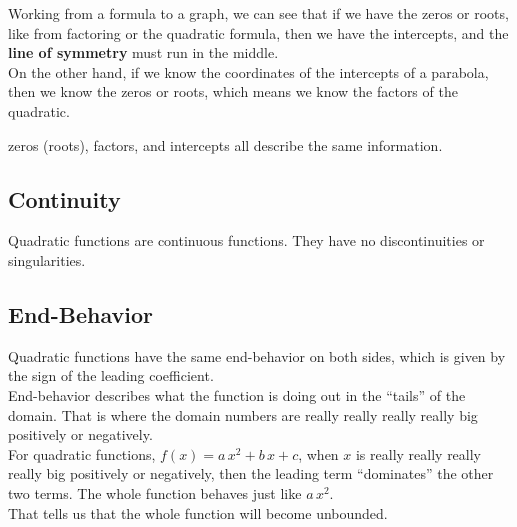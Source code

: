 \documentclass{ximera}
\begin{document}
Working from a formula to a graph, we can see that if we have the zeros or roots, like from factoring or the quadratic formula, then we have the intercepts, and the \textbf{line of symmetry} must run in the middle. \\


On the other hand, if we know the coordinates of the intercepts of a parabola, then we know the zeros or roots, which means we know the factors of the quadratic.




\begin{idea}

zeros (roots), factors, and intercepts all describe the same information.


\end{idea}






\subsection*{Continuity}

Quadratic functions are continuous functions.  They have no discontinuities or singularities. \\












\subsection*{End-Behavior}

Quadratic functions have the same end-behavior on both sides, which is given by the sign of the leading coefficient. \\


End-behavior describes what the function is doing out in the ``tails'' of the domain.  That is where the domain numbers are really really really really big positively or negatively. \\

For quadratic functions, $f(x) = a \, x^2 + b \, x + c$, when $x$ is really really really really big positively or negatively, then the leading term ``dominates'' the other two terms.  The whole function behaves just like $a \, x^2$. \\

That tells us that the whole function will become unbounded. \\
\end{document}
